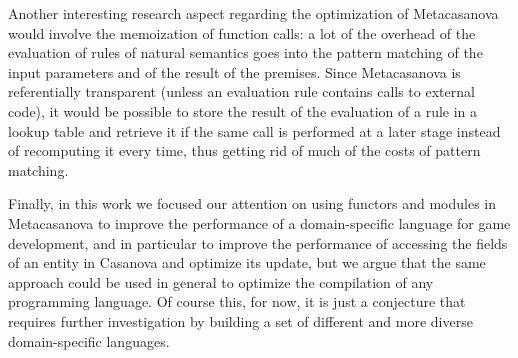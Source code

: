 Another interesting research aspect regarding the optimization of Metacasanova would involve the memoization of function calls: a lot of the overhead of the evaluation of rules of natural semantics goes into the pattern matching of the input parameters and of the result of the premises. Since Metacasanova is referentially transparent (unless an evaluation rule contains calls to external code), it would be possible to store the result of the evaluation of a rule in a lookup table and retrieve it if the same call is performed at a later stage instead of recomputing it every time, thus getting rid of much of the costs of pattern matching.

Finally, in this work we focused our attention on using functors and modules in Metacasanova to improve the performance of a domain-specific language for game development, and in particular to improve the performance of accessing the fields of an entity in Casanova and optimize its update, but we argue that the same approach could be used in general to optimize the compilation of any programming language. Of course this, for now, it is just a conjecture that requires further investigation by building a set of different and more diverse domain-specific languages.

